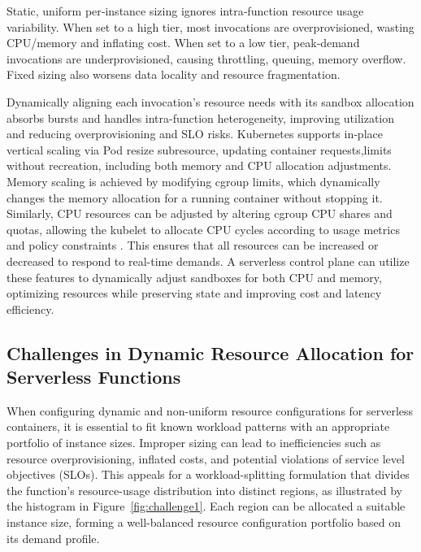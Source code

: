 Static, uniform per‑instance sizing ignores intra‑function resource usage variability.
When set to a high tier, most invocations are overprovisioned, wasting CPU/memory
and inflating cost. When set to a low tier, peak‑demand invocations are
underprovisioned, causing throttling, queuing, memory overflow.
Fixed sizing also worsens data locality and resource fragmentation.

Dynamically aligning each invocation's resource needs with its sandbox allocation
absorbs bursts and handles intra-function heterogeneity, improving utilization and
reducing overprovisioning and SLO risks. Kubernetes supports in‑place vertical scaling
via Pod resize subresource, updating container {requests,limits} without recreation,
including both memory and CPU allocation adjustments. Memory scaling is achieved by modifying cgroup limits,
which dynamically changes the memory allocation for a running container without stopping it.
Similarly, CPU resources can be adjusted by altering cgroup CPU shares and quotas, allowing the kubelet
to allocate CPU cycles according to usage metrics and policy constraints \cite{Doc:K8s_Pod_Resize, Doc:K8s_CRI_Update}.
This ensures that all resources can be increased or decreased to respond to real-time demands.
A serverless control plane can utilize these features to dynamically adjust sandboxes for
both CPU and memory, optimizing resources while preserving state and improving cost and latency efficiency.


\subsection{Challenges in Dynamic Resource Allocation for Serverless Functions}
\label{sec:background:challenges}


When configuring dynamic and non-uniform resource configurations for serverless
containers, it is essential to fit known workload patterns with an appropriate
portfolio of instance sizes. Improper sizing can lead to inefficiencies such as
resource overprovisioning, inflated costs, and potential violations of service
level objectives (SLOs). This appeals for a workload-splitting formulation that
divides the function's resource-usage distribution into distinct regions, as
illustrated by the histogram in Figure~\ref{fig:challenge1}. Each region can be
allocated a suitable instance size, forming a well-balanced resource
configuration portfolio based on its demand profile.

